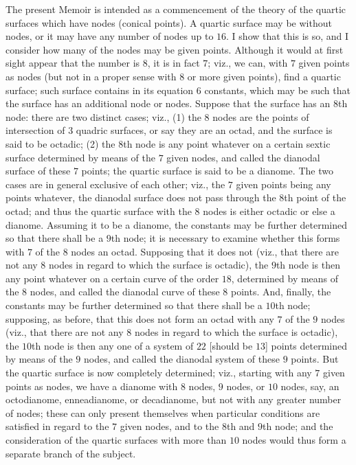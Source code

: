 \documentclass[11pt,a4paper]{article}
\begin{document}
The present Memoir is intended as a commencement of the theory of the quartic surfaces
which have nodes (conical points). A quartic surface may be without nodes, or it may have
any number of nodes up to $16$. I show that this is so, and I consider how many of the
nodes may be given points. Although it would at first sight appear that the number is $8$,
it is in fact $7$; viz., we can, with $7$ given points as nodes (but not in a proper sense
with $8$ or more given points), find a quartic surface; such surface contains in its
equation $6$ constants, which may be such that the surface has an additional node or nodes.
Suppose that the surface has an $8$th node: there are two distinct cases; viz., (1) the $8$
nodes are the points of intersection of $3$ quadric surfaces, or say they are an octad, and
the surface is said to be octadic; (2) the $8$th node is any point whatever on a certain
sextic surface determined by means of the $7$ given nodes, and called the dianodal surface
of these $7$ points; the quartic surface is said to be a dianome. The two cases are in
general exclusive of each other; viz., the $7$ given points being any points whatever, the
dianodal surface does not pass through the $8$th point of the octad; and thus the quartic
surface with the $8$ nodes is either octadic or else a dianome. Assuming it to be a
dianome, the constants may be further determined so that there shall be a $9$th node; it
is necessary to examine whether this forms with $7$ of the $8$ nodes an octad. Supposing
that it does not (viz., that there are not any $8$ nodes in regard to which the surface is
octadic), the $9$th node is then any point whatever on a certain curve of the order $18$,
determined by means of the $8$ nodes, and called the dianodal curve of these $8$ points.
And, finally, the constants may be further determined so that there shall be a $10$th node;
supposing, as before, that this does not form an octad with any $7$ of the $9$ nodes (viz.,
that there are not any $8$ nodes in regard to which the surface is octadic), the $10$th
node is then any one of a system of $22$ [should be $13$] points determined by means of the
$9$ nodes, and called the dianodal system of these $9$ points. But the quartic surface is
now completely determined; viz., starting with any $7$ given points as nodes, we have a
dianome with $8$ nodes, $9$ nodes, or $10$ nodes, say, an octodianome, enneadianome, or
decadianome, but not with any greater number of nodes; these can only present themselves
when particular conditions are satisfied in regard to the $7$ given nodes, and to the $8$th
and $9$th node; and the consideration of the quartic surfaces with more than $10$ nodes
would thus form a separate branch of the subject.
\end{document}
